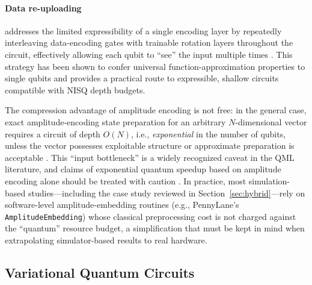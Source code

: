 \documentclass[11pt,a4paper]{article}
\begin{document}
\paragraph{Data re-uploading} addresses the limited expressibility of a
single encoding layer by repeatedly interleaving data-encoding gates with
trainable rotation layers throughout the circuit, effectively allowing each
qubit to ``see'' the input multiple times \cite{perez2020}.  This strategy
has been shown to confer universal function-approximation properties to single
qubits and provides a practical route to expressible, shallow circuits
compatible with NISQ depth budgets.

The compression advantage of amplitude encoding is not free: in the general
case, exact amplitude-encoding state preparation for an arbitrary
$N$-dimensional vector requires a circuit of depth $O(N)$, i.e.,
\emph{exponential} in the number of qubits, unless the vector possesses
exploitable structure or approximate preparation is acceptable
\cite{aaronson2015}.  This ``input bottleneck'' is a widely recognized caveat
in the QML literature, and claims of exponential quantum speedup based on
amplitude encoding alone should be treated with caution
\cite{aaronson2015,biamonte2017}.  In practice, most simulation-based
studies---including the case study reviewed in Section~\ref{sec:hybrid}---rely
on software-level amplitude-embedding routines (e.g., PennyLane's
\texttt{AmplitudeEmbedding}) whose classical preprocessing cost is not charged
against the ``quantum'' resource budget, a simplification that must be kept
in mind when extrapolating simulator-based results to real hardware.

\subsection{Variational Quantum Circuits}
\label{sec:vqc}
\end{document}
